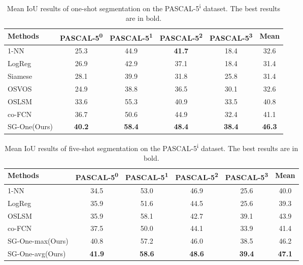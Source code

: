 \documentclass[journal]{IEEEtran}
\begin{document}
\begin{table*}[ht]\setlength{\tabcolsep}{18pt}
  \centering
  \caption{Mean IoU results of one-shot segmentation on the PASCAL-5\textsuperscript{i} dataset. The best  results are in bold.}\label{comp_one}
  \begin{tabular}{l|cccc|c}
    \hline
    \hline
    \textbf{Methods\footnotemark} 
    & \textbf{PASCAL-5\textsuperscript{0}} & \textbf{PASCAL-5\textsuperscript{1}} & \textbf{PASCAL-5\textsuperscript{2}} & \textbf{PASCAL-5\textsuperscript{3}} & \textbf{Mean} \\
    \hline
    1-NN &  25.3 & 44.9 & \textbf{41.7} & 18.4  & 32.6\\
LogReg & 26.9 & 42.9 & 37.1 & 18.4 & 31.4\\
Siamese & 28.1 & 39.9 & 31.8 & 25.8 & 31.4\\
OSVOS~\cite{caelles2017one} & 24.9 & 38.8 & 36.5 & 30.1 & 32.6\\
OSLSM~\cite{shaban2017one} &  33.6 & 55.3 & 40.9 & 33.5 & 40.8\\
co-FCN~\cite{rakelly2018conditional} &  36.7  & 50.6 & 44.9 & 32.4 & 41.1 \\
SG-One(Ours) &  \textbf{40.2} & \textbf{58.4}  & \textbf{48.4}  & \textbf{38.4} & \textbf{46.3} \\
    \hline
    \hline
  \end{tabular}
  \vspace{-10pt}
\end{table*}


\begin{table*}[ht]\setlength{\tabcolsep}{17pt}
  \centering
  \caption{Mean IoU results of five-shot segmentation on the PASCAL-5\textsuperscript{i} dataset. The best results are in bold.}\label{comp_five}
  \begin{tabular}{l|cccc|c}
    \hline
    \hline
    \textbf{Methods} & \textbf{PASCAL-5\textsuperscript{0}} & \textbf{PASCAL-5\textsuperscript{1}} & \textbf{PASCAL-5\textsuperscript{2}} & \textbf{PASCAL-5\textsuperscript{3}} & \textbf{Mean} \\
    \hline
    1-NN & 34.5 & 53.0 & 46.9 & 25.6 & 40.0 \\
LogReg & 35.9 & 51.6 & 44.5 & 25.6 & 39.3\\
OSLSM~\cite{shaban2017one} &  35.9 & 58.1 & 42.7 & 39.1 & 43.9\\
co-FCN~\cite{rakelly2018conditional} &  37.5 & 	50.0 & 44.1 & 33.9 & 41.4\\
SG-One-max(Ours) & 40.8  & 57.2 & 46.0 & 38.5  & 46.2\\
SG-One-avg(Ours) & \textbf{41.9}  & \textbf{58.6} &  \textbf{48.6} & \textbf{39.4} & \textbf{47.1} \\
    \hline
    \hline
  \end{tabular}
  \vspace{-10pt}
\end{table*}
\end{document}
